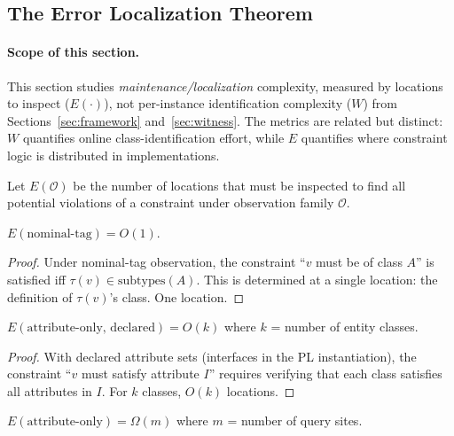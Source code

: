 \subsection{The Error Localization Theorem}\label{the-error-localization-theorem}

\paragraph{Scope of this section.}
This section studies \emph{maintenance/localization} complexity, measured by locations to inspect ($E(\cdot)$), not per-instance identification complexity ($W$) from Sections~\ref{sec:framework} and~\ref{sec:witness}. The metrics are related but distinct: $W$ quantifies online class-identification effort, while $E$ quantifies where constraint logic is distributed in implementations.

\begin{definition}
Let $E(\mathcal{O})$ be the number of locations that must be inspected to find all potential violations of a constraint under observation family $\mathcal{O}$.
\end{definition}

\begin{theorem}\label{thm:nominal-localization}
$E(\text{nominal-tag}) = O(1)$.
\end{theorem}

\begin{proof}
Under nominal-tag observation, the constraint ``$v$ must be of class $A$'' is satisfied iff $\tau(v) \in \text{subtypes}(A)$. This is determined at a single location: the definition of $\tau(v)$'s class. One location.
\end{proof}

\begin{theorem}\label{thm:declared-localization}
$E(\text{attribute-only, declared}) = O(k)$ where $k$ = number of entity classes.
\end{theorem}

\begin{proof}
With declared attribute sets (interfaces in the PL instantiation), the constraint ``$v$ must satisfy attribute $I$'' requires verifying that each class satisfies all attributes in $I$. For $k$ classes, $O(k)$ locations.
\end{proof}

\begin{theorem}\label{thm:attribute-localization}
$E(\text{attribute-only}) = \Omega(m)$ where $m$ = number of query sites.
\end{theorem}


